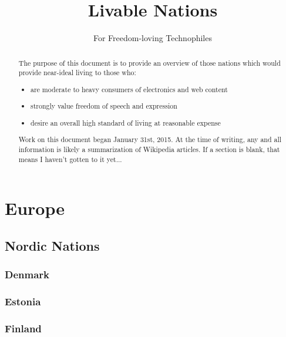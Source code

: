 \documentclass[12pt]{article}
\title{Livable Nations}
\subtitle{For Freedom-loving Technophiles}
\date{}
\begin{document}
\maketitle



\begin{abstract}


The purpose of this document is to provide an overview of those nations which would provide near-ideal living to those who:

\begin{itemize}
\item are moderate to heavy consumers of electronics and web content
\item strongly value freedom of speech and expression
\item desire an overall high standard of living at reasonable expense
\end{itemize}


Work on this document began January 31st, 2015. At the time of writing, any and all information is likely a summarization of Wikipedia articles. If a section is blank, that means I haven't gotten to it yet...

\end{abstract}

\newpage
\tableofcontents
\newpage



\section{Europe}



\subsection{Nordic Nations}


\subsubsection{Denmark}

\subsubsection{Estonia}

\subsubsection{Finland}
\end{document}
